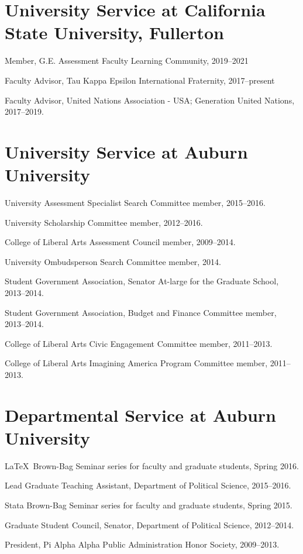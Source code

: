 \documentclass[11pt,letterpaper]{article}
\renewenvironment{itemize}{
  \begin{list}{}{
    \setlength{\leftmargin}{1.5em}
    \setlength{\itemsep}{0.25em}
    \setlength{\parskip}{0pt}
    \setlength{\parsep}{0.25em}
  }
}{
  \end{list}
}
\begin{document}
\section*{University Service at California State University, Fullerton}
	\begin{itemize}
		\item Member, G.E. Assessment Faculty Learning Community, 2019--2021
		\item Faculty Advisor, Tau Kappa Epsilon International Fraternity, 2017--present
		\item Faculty Advisor, United Nations Association - USA; Generation United Nations, 2017--2019.
	\end{itemize}
	
\section*{University Service at Auburn University}
\begin{itemize}
	\item University Assessment Specialist Search Committee member, 2015--2016.
	\item University Scholarship Committee member, 2012--2016.
	\item College of Liberal Arts Assessment Council member, 2009--2014.
	\item University Ombudsperson Search Committee member, 2014.  
	\item Student Government Association, Senator At-large for the Graduate School, 2013--2014.
	\item Student Government Association, Budget and Finance Committee member, 2013--2014.
	\item College of Liberal Arts Civic Engagement Committee member, 2011--2013.
	\item College of Liberal Arts Imagining America Program Committee member, 2011--2013.
\end{itemize}

\section*{Departmental Service at Auburn University}
	\begin{itemize}
		\item \LaTeX~Brown-Bag Seminar series for faculty and graduate students, Spring 2016.
		\item Lead Graduate Teaching Assistant, Department of Political Science, 2015--2016.
		\item Stata Brown-Bag Seminar series for faculty and graduate students, Spring 2015.
		\item Graduate Student Council, Senator, Department of Political Science, 2012--2014.
		\item President, Pi Alpha Alpha Public Administration Honor Society, 2009--2013.
	\end{itemize}
\end{document}
